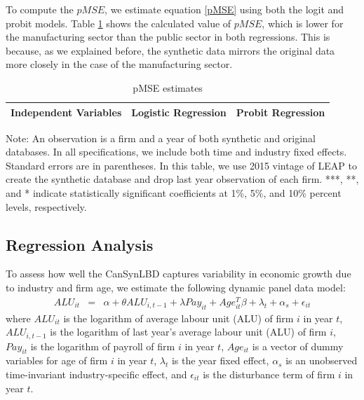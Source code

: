 To compute the $pMSE$, we estimate equation \ref{pMSE} using both the logit and probit models. Table \ref{pMSE_regression}   shows the calculated value of $pMSE$, which is lower for the manufacturing sector than the public sector in both regressions. This is because, as we explained before, the synthetic data mirrors the original data more closely in the case of the manufacturing sector.

\begin{table}[H]
  \centering
\begin{threeparttable}
 \caption{pMSE estimates} \label{pMSE_regression} \medskip
\renewcommand{\arraystretch}{1}
\begin{tabular}{l|c c| c c}
\toprule
\textbf{Independent Variables}&\multicolumn{2}{c|}{\textbf{Logistic Regression}} &  \multicolumn{2}{c}{\textbf{Probit Regression}}\\
\midrule

   \bottomrule
  \end{tabular} 
\begin{tablenotes}
\small
\item Note: An observation is a firm and a year of both synthetic and original databases. In all specifications, we include both time and industry fixed effects. Standard errors are in parentheses. In this table, we use 2015 vintage of LEAP to create the synthetic database and drop last year observation of each firm. ***, **, and * indicate statistically significant coefficients at 1\%, 5\%, and 10\% percent levels, respectively.
 \end{tablenotes}
 \end{threeparttable}
\end{table}

\subsection{Regression Analysis}

To assess how well the CanSynLBD captures variability in economic growth due to industry and firm age, we estimate the following dynamic panel data model:
\begin{eqnarray}	
ALU_{it} & = & \alpha + \theta ALU_{i,t-1} + \lambda Pay_{it} + Age_{it}^{T}\beta + \lambda_t + \alpha_s + \epsilon_{it}
\end{eqnarray}
where $ALU_{it}$ is the logarithm of average labour unit (ALU) of firm $i$ in year $t$, $ALU_{i,t-1}$ is the logarithm of last year's average labour unit (ALU) of firm $i$, $Pay_{it}$ is the logarithm of payroll of firm $i$ in year $t$, $Age_{it}$ is a vector of dummy variables for age of firm $i$ in year $t$, $\lambda_t$ is the year fixed effect, $\alpha_s$ is an unobserved time-invariant industry-specific effect, and $\epsilon_{it}$ is the disturbance term of firm $i$ in year $t$. 

